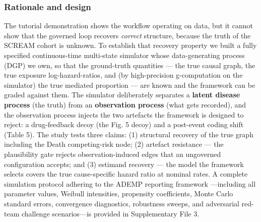 \documentclass[sn-vancouver-num]{sn-jnl}
\begin{document}
\subsubsection{Rationale and design}
The tutorial demonstration shows the workflow operating on data, but it cannot show that the governed loop recovers \textit{correct} structure, because the truth of the SCREAM cohort is unknown. To establish that recovery property we built a fully specified continuous-time multi-state simulator whose data-generating process (DGP) we own, so that the ground-truth quantities --- the true causal graph, the true exposure log-hazard-ratios, and (by high-precision g-computation on the simulator) the true mediated proportion --- are known and the framework can be graded against them. The simulator deliberately separates a \textbf{latent disease process} (the truth) from an \textbf{observation process} (what gets recorded), and the observation process injects the two artefacts the framework is designed to reject: a drug-feedback decoy (the Fig. 5 decoy) and a post-event coding shift (Table 5). The study tests three claims: (1) structural recovery of the true graph including the Death competing-risk node; (2) artefact resistance --- the plausibility gate rejects observation-induced edges that an ungoverned configuration accepts; and (3) estimand recovery --- the model the framework selects covers the true cause-specific hazard ratio at nominal rates. A complete simulation protocol adhering to the ADEMP reporting framework \citep{morris2019}---including all parameter values, Weibull intensities, propensity coefficients, Monte Carlo standard errors, convergence diagnostics, robustness sweeps, and adversarial red-team challenge scenarios---is provided in Supplementary File 3.
\end{document}
